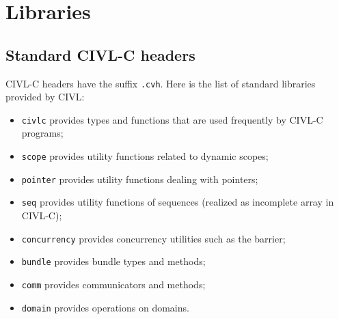 




\chapter{Libraries}

\section{Standard CIVL-C headers}
CIVL-C headers have the suffix \texttt{.cvh}. Here is the list of standard libraries provided by CIVL:
\begin{itemize}
\item \texttt{civlc} provides types and functions that are used frequently by CIVL-C programs; 
\item \texttt{scope} provides utility functions related to dynamic scopes;
\item \texttt{pointer} provides utility functions dealing with pointers;
\item \texttt{seq} provides utility functions of sequences (realized as incomplete array in CIVL-C);
\item \texttt{concurrency} provides concurrency utilities such as the barrier;
\item \texttt{bundle} provides bundle types and methods;
\item \texttt{comm} provides communicators and methods;
\item \texttt{domain} provides operations on domains.
\end{itemize}


